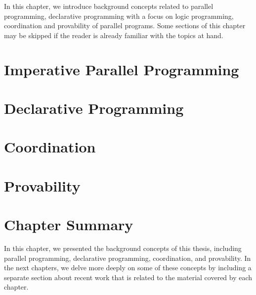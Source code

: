 In this chapter, we introduce background concepts related to parallel
programming, declarative programming with a focus on logic programming,
coordination and provability of parallel programs. Some sections of this chapter
may be skipped if the reader is already familiar with the topics at hand.

\section{Imperative Parallel Programming}


\section{Declarative Programming}\label{section:background:declarative}


\section{Coordination}\label{sec:background:coordination}


\section{Provability}

\section{Chapter Summary}

In this chapter, we presented the background concepts of this thesis, including
parallel programming, declarative programming, coordination, and provability. In
the next chapters, we delve more deeply on some of these concepts by including a
separate section about recent work that is related to the material covered by
each chapter.
